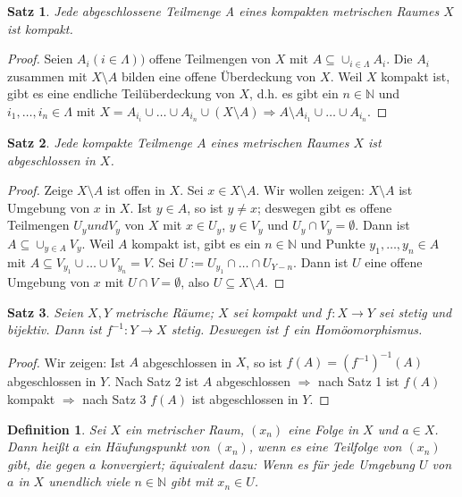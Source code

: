 \documentclass[10pt,a4paper]{report}
\newtheorem{satz}{Satz}
\newtheorem*{defi}{Definition}
\begin{document}
\begin{satz}
  Jede abgeschlossene Teilmenge A eines kompakten metrischen Raumes $X$ ist kompakt.
\end{satz}

\begin{proof}
  Seien $A_{i} (i \in \Lambda))$ offene Teilmengen von $X$ mit $A \subseteq \cup_{i \in \Lambda} A_{i}$.
  Die $A_{i}$ zusammen mit $X \setminus A$ bilden eine offene Überdeckung von $X$.
  Weil $X$ kompakt ist, gibt es eine endliche Teilüberdeckung von $X$, d.h. es gibt ein $n \in \mathbb{N}$ und $i_{1}, \dots, i_{n} \in \Lambda$ mit $X = A_{i_{i}} \cup \dots \cup A_{i_{n}} \cup (X \setminus A) \Rightarrow A \setminus A_{i_{1}} \cup \dots \cup A_{i_{n}}$.
\end{proof}

\begin{satz}
  Jede kompakte Teilmenge $A$ eines metrischen Raumes $X$ ist abgeschlossen in $X$.
\end{satz}

\begin{proof}
  Zeige $X \setminus A$ ist offen in $X$.
  Sei $x \in X \setminus A$.
  Wir wollen zeigen: $X \setminus A$ ist Umgebung von $x$ in $X$.
  Ist $y \in A$, so ist $y \ne x$; deswegen gibt es offene Teilmengen $U_{y} und V_{y}$ von $X$ mit $x \in U_{y}$, $y \in V_{y}$ und $U_{y} \cap V_{y} = \emptyset$.
  Dann ist $A \subseteq \cup_{y \in A} V_{y}$.
  Weil $A$ kompakt ist, gibt es ein $n \in \mathbb{N}$ und Punkte $y_{1}, \dots, y_{n} \in A$ mit $A \subseteq V_{y_{1}} \cup \dots \cup V_{y_{n}} = V$.
  Sei $U := U_{y_{1}} \cap \dots \cap U_{Y-n}$.
  Dann ist $U$ eine offene Umgebung von $x$ mit $U \cap V = \emptyset$, also $U \subseteq X \setminus A$.
\end{proof}

\begin{satz}
  Seien $X, Y$ metrische Räume; $X$ sei kompakt und $f : X \rightarrow Y$ sei stetig und bijektiv.
  Dann ist $f^{-1} : Y \rightarrow X$ stetig.
  Deswegen ist $f$ ein Homöomorphismus.
\end{satz}

\begin{proof}
  Wir zeigen: Ist $A$ abgeschlossen in $X$, so ist $f(A) = (f^{-1})^{-1}(A)$ abgeschlossen in $Y$.
  Nach Satz 2 ist $A$ abgeschlossen $\Rightarrow$ nach Satz 1 ist $f(A)$ kompakt $\Rightarrow$ nach Satz 3 $f(A)$ ist abgeschlossen in $Y$.
\end{proof}

\begin{defi}
  Sei $X$ ein metrischer Raum, $(x_{n})$ eine Folge in $X$ und $a \in X$.
  Dann heißt $a$ ein Häufungspunkt von $(x_{n})$, wenn es eine Teilfolge von $(x_{n})$ gibt, die gegen $a$ konvergiert; äquivalent dazu: Wenn es für jede Umgebung $U$ von $a$ in $X$ unendlich viele $n \in \mathbb{N}$ gibt mit $x_{n} \in U$.
\end{defi}
\end{document}
